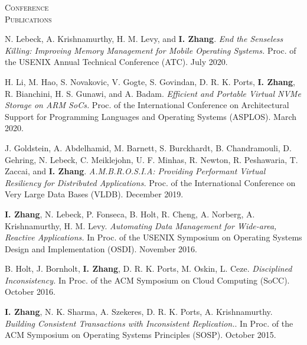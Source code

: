 \documentclass[10pt,times]{report}
\newlength{\sectiongap}
\newlength{\sectioncolwidth}
\newlength{\colgap}
\newlength{\stuffwidth}
\newenvironment{rtable}{
  \begin{minipage}{\textwidth}
  }{
  \end{minipage}
}
\newenvironment{rsection}[1]{
  \begin{minipage}[t]{\sectioncolwidth}
    \textsc{#1}
  \end{minipage}
  \hspace{\colgap}
  \begin{minipage}[t]{\stuffwidth}
  }{
    \removelastskip
  \end{minipage}
  \\[\sectiongap]
}
\begin{document}
\begin{rtable}
\begin{rsection}{Conference\\Publications}
    N. Lebeck, A. Krishnamurthy, H. M. Levy, and
    \textbf{I. Zhang}. \textit{End the Senseless Killing: Improving
      Memory Management for Mobile Operating Systems.}  Proc. of
    the USENIX Annual Technical Conference (ATC). July
    2020. \\\vspace{-0.5em}

    H. Li, M. Hao, S. Novakovic, V. Gogte, S. Govindan,
    D. R. K. Ports, \textbf{I. Zhang}, R. Bianchini, H. S. Gunawi, and
    A. Badam. \textit{ Efficient and Portable Virtual NVMe Storage on
      ARM SoCs.}  Proc. of the International Conference on
    Architectural Support for Programming Languages and Operating
    Systems (ASPLOS). March 2020.\\\vspace{-0.5em}
    
    J. Goldstein, A. Abdelhamid, M. Barnett, S. Burckhardt,
    B. Chandramouli, D. Gehring, N. Lebeck, C.  Meiklejohn,
    U. F. Minhas, R. Newton, R. Peshawaria, T.  Zaccai, and
    \textbf{I. Zhang}.  \textit{ A.M.B.R.O.S.I.A: Providing Performant
      Virtual Resiliency for Distributed Applications.} Proc. of
    the International Conference on Very Large Data Bases (VLDB).
    December 2019. \\\vspace{-0.5em}

    \textbf{I. Zhang}, N. Lebeck, P. Fonseca, B. Holt, R. Cheng,
    A. Norberg, A. Krishnamurthy, H.  M. Levy. \textit{Automating Data
      Management for Wide-area, Reactive Applications.}  In
    Proc. of the USENIX Symposium on Operating Systems Design
    and Implementation (OSDI). November 2016.\\\vspace{-0.5em}

    B. Holt, J. Bornholt, \textbf{I. Zhang}, D. R. K. Ports, M.
    Oskin, L. Ceze. \textit{Disciplined Inconsistency.}  In
    Proc. of the ACM Symposium on Cloud Computing (SoCC).
    October 2016.\\\vspace{-0.5em}

    \textbf{I. Zhang}, N. K. Sharma, A. Szekeres, D. R. K. Ports,
    A. Krishnamurthy. \textit{Building Consistent Transactions with
      Inconsistent Replication.}.  In Proc. of the ACM Symposium
    on Operating Systems Principles (SOSP).  October
    2015.\\\vspace{-0.5em}


\end{rsection}
\end{rtable}
\end{document}
